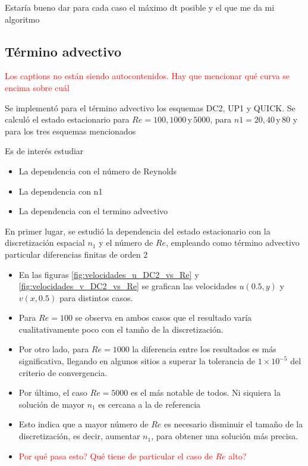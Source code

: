 \documentclass[aps,prb,twocolumn,superscriptaddress,floatfix,longbibliography,10pt]{revtex4-2}
\newif\ifptitle
\newif\ifpnumber
\newcounter{para}
\newcommand\ptitle[1]{\par\refstepcounter{para}
{\ifpnumber{\noindent\textcolor{lightgray}{\textbf{\thepara}}\indent}\fi}
{\ifptitle{\textbf{[{#1}]}}\fi}}
\begin{document}
Estaría bueno dar para cada caso el máximo dt posible y el que me da mi algoritmo

\subsection{Término advectivo}
\textcolor{red}{Los captions no están siendo autocontenidos. Hay que mencionar qué curva se encima sobre cuál}


Se implementó para el término advectivo los esquemas DC2, UP1 y QUICK. Se calculó el estado estacionario para $Re = 100, 1000 \, \mathrm{y} \, 5000$, para $n1 = 20, 40 \, \mathrm{y} \, 80$ y para los tres esquemas mencionados

Es de interés estudiar
\begin{itemize}
  \item La dependencia con el número de Reynolds
  \item La dependencia con n1
  \item La dependencia con el termino advectivo
\end{itemize}

\ptitle{Comparación DC2 vs n1 para distintos Re}
En primer lugar, se estudió la dependencia del estado estacionario con la discretización espacial $n_1$ y el número de $Re$, empleando como término advectivo particular diferencias finitas de orden 2
\begin{itemize}
  \item En las figuras \ref{fig:velocidades_u_DC2_vs_Re} y \ref{fig:velocidades_v_DC2_vs_Re} se grafican las velocidades $u(0.5,y)$ y $v(x,0.5)$ para distintos casos.
  \item Para $Re = 100$ se observa en ambos casos que el resultado varía cualitativamente poco con el tamño de la discretización.
  \item Por otro lado, para $Re = 1000$ la diferencia entre los resultados es más significativa, llegando en algunos sitios a superar la tolerancia de $1 \times 10^{-5}$ del criterio de convergencia.
  \item Por último, el caso $Re = 5000$ es el más notable de todos. Ni siquiera la solución de mayor $n_1$ es cercana a la de referencia
  \item Esto indica que a mayor número de $Re$ es necesario disminuir el tamaño de la discretización, es decir, aumentar $n_1$, para obtener una solución más precisa.
  \item \textcolor{red}{Por qué pasa esto? Qué tiene de particular el caso de $Re$ alto?}
\end{itemize}
\end{document}
